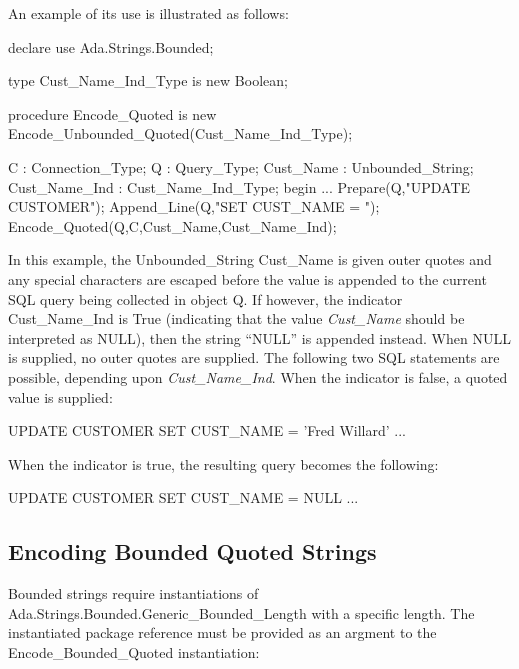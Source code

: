 \documentclass[english,letterpaper]{book}
\begin{document}
An example of its use is illustrated as follows:

\begin{Example}
declare
   use Ada.Strings.Bounded;

   type Cust_Name_Ind_Type is new Boolean;

   procedure Encode_Quoted 
      is new Encode_Unbounded_Quoted(Cust_Name_Ind_Type);

   C :             Connection_Type;
   Q :             Query_Type;
   Cust_Name :     Unbounded_String;
   Cust_Name_Ind : Cust_Name_Ind_Type;
begin
   ...
   Prepare(Q,"UPDATE CUSTOMER");
   Append_Line(Q,"SET CUST_NAME = ");
   Encode_Quoted(Q,C,Cust_Name,Cust_Name_Ind);
\end{Example}

In this example, the Unbounded\_String Cust\_Name is given
outer quotes and any special characters are escaped before the value
is appended to the current SQL query being collected in object Q.
If however, the indicator Cust\_Name\_Ind is True (indicating
that the value \emph{Cust\_Name} should be interpreted as NULL), then
the string ``NULL'' is appended instead. When NULL is supplied,
no outer quotes are supplied. The following two SQL statements are
possible, depending upon \emph{Cust\_Name\_Ind}. When the indicator
is false, a quoted value is supplied:

\begin{SQL}
UPDATE CUSTOMER
SET CUST_NAME = 'Fred Willard'
...
\end{SQL}

When the indicator is true, the resulting query becomes the following:

\begin{SQL}
UPDATE CUSTOMER
SET CUST_NAME = NULL
...
\end{SQL}

\subsection{Encoding Bounded Quoted Strings}

Bounded strings require instantiations of
Ada\-.Strings\-.Bounded\-.Gen\-eric\-\_Bound\-ed\-\_Len\-gth
with a specific length. The instantiated
package reference must be provided as an argment to the
Encode\-\_Bounded\-\_Quoted instantiation:
\end{document}
